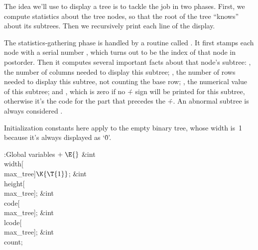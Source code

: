 The idea we'll use to display a tree is to tackle the job in two phases.
First, we compute statistics about the tree nodes, so that the root of
the tree ``knows'' about its subtrees. Then we recursively print each
line of the display.

The statistics-gathering phase is handled by a routine called .
It first stamps each node with a serial number , which turns out to be
the index of that node in postorder. Then it computes several important
facts about that node's subtree: , the number of columns
needed to display this subtree; , the number
of rows needed to display this subtree, not counting the base row;
, the numerical value of this subtree; and
, which is zero if no \.+ sign will be printed for
this subtree, otherwise it's the code for the part that precedes
the \.+. An abnormal subtree is always considered .

Initialization constants here apply to the empty binary tree, whose
width is~1 because it's always displayed as `\.0'.

\Y\B\4:Global variables\X${}\mathrel+\E{}$\6
\&{int} \\{width}[\\{max\_tree}]${}\K\{\T{1}\}{}$;\6
\&{int} \\{height}[\\{max\_tree}];\6
\&{int} \\{code}[\\{max\_tree}];\6
\&{int} \\{lcode}[\\{max\_tree}];\6
\&{int} \\{count};\par
\fi

